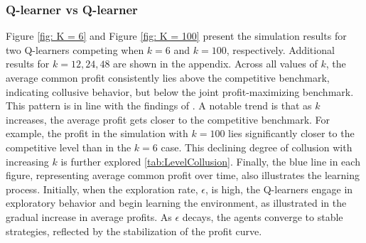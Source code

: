 \documentclass{article}
\begin{document}
\subsubsection{Q-learner vs Q-learner}
\label{QvsQ}
Figure \ref{fig: K = 6} and Figure \ref{fig: K = 100} present the simulation results for two Q-learners competing when $ k = 6 $ and $ k = 100 $, respectively. Additional results for $ k = 12, 24, 48 $ are shown in the appendix. Across all values of $ k $, the average common profit consistently lies above the competitive benchmark, indicating collusive behavior, but below the joint profit-maximizing benchmark. This pattern is in line with the findings of \cite{Klein2021}.
\newline
A notable trend is that as $ k $ increases, the average profit gets closer to the competitive benchmark. For example, the profit in the simulation with $k = 100 $ lies significantly closer to the competitive level than in the $ k = 6 $ case. This declining degree of collusion with increasing $ k $ is further explored \ref{tab:LevelCollusion}.
\newline
Finally, the blue line in each figure, representing average common profit over time, also illustrates the learning process. Initially, when the exploration rate, $\epsilon$, is high, the Q-learners engage in exploratory behavior and begin learning the environment, as illustrated in the gradual increase in average profits. As $ \epsilon $ decays, the agents converge to stable strategies, reflected by the stabilization of the profit curve.
\end{document}
